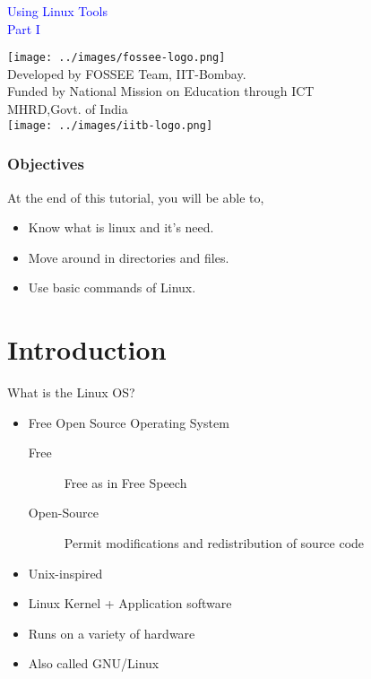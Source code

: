 \documentclass[12pt,compress]{beamer}
\begin{document}
\begin{frame}

\begin{center}
\vspace{12pt}
\textcolor{blue}{\huge Using Linux Tools\\Part I}
\end{center}
\vspace{18pt}
\begin{center}
\vspace{10pt}
\texttt{[image: ../images/fossee-logo.png]}\\
\vspace{5pt}
\scriptsize Developed by FOSSEE Team, IIT-Bombay. \\ 
\scriptsize Funded by National Mission on Education through ICT\\
\scriptsize  MHRD,Govt. of India\\
\texttt{[image: ../images/iitb-logo.png]}\\
\end{center}
\end{frame}

\begin{frame}
\frametitle{Objectives}
\label{sec-2}

At the end of this tutorial, you will be able to,
\begin{itemize}
\item Know what is linux and it's need.
\item Move around in directories and files.
\item Use basic commands of Linux.
\end{itemize}
\end{frame}


\section{Introduction}
\begin{frame}[fragile]
  \begin{block}{What is the Linux OS?}
    \begin{itemize}
    \item Free Open Source Operating System
      \begin{description}
        \item[Free] 
          Free as in Free Speech
        \item[Open-Source]
          Permit modifications and redistribution of source code
      \end{description}
    \item Unix-inspired
    \item Linux Kernel + Application software
    \item Runs on a variety of hardware
    \item Also called GNU/Linux
    \end{itemize}
  \end{block}
\end{frame}
\end{document}
